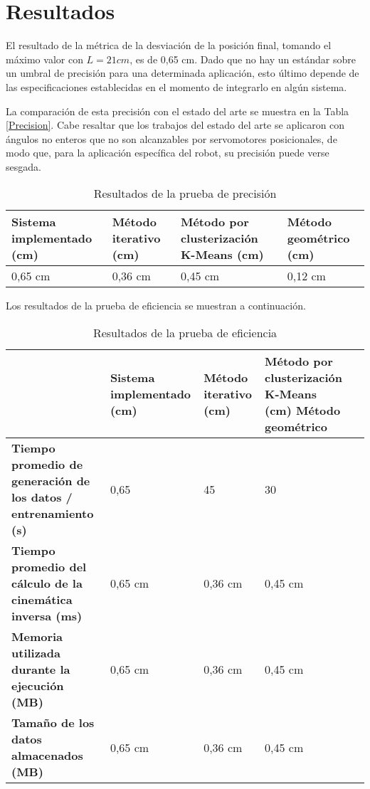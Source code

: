 \section{Resultados}

El resultado de la métrica de la desviación de la posición final, tomando el máximo valor con $L = 21 cm$, es de 0,65 cm. Dado que no hay un estándar sobre un umbral de precisión para una determinada aplicación, esto último depende de las especificaciones establecidas en el momento de integrarlo en algún sistema.

La comparación de esta precisión con el estado del arte se muestra en la Tabla \ref{Precision}. Cabe resaltar que los trabajos del estado del arte se aplicaron con ángulos no enteros que no son alcanzables por servomotores posicionales, de modo que, para la aplicación específica del robot, su precisión puede verse sesgada.

\begin{table}[ht]
	\centering
	\begin{tabular}{p{5cm}p{4cm}p{3.6cm}p{4cm}}
		\hline
		\textbf{Sistema implementado (cm)} & \textbf{Método iterativo (cm)} & \textbf{Método por clusterización K-Means (cm)} & \textbf{Método geométrico (cm)} \\
		\hline
		0,65 cm & 0,36 cm & 0,45 cm & 0,12 cm \\
		\hline
	\end{tabular}
	\caption{Resultados de la prueba de precisión}
	\label{tab:Precision}
\end{table}

Los resultados de la prueba de eficiencia se muestran a continuación.

\begin{table}[ht]
	\centering
	\begin{tabular}{p{4cm}p{5cm}p{4cm}p{3.6cm}p{4cm}}
		\hline
	    \texbf{} & \textbf{Sistema implementado (cm)} & \textbf{Método iterativo (cm)} & \textbf{Método por clusterización K-Means (cm)} \textbf{Método geométrico} \\
		\hline
		\textbf{Tiempo promedio de generación de los datos / entrenamiento (s)} & 0,65 & 45 & 30 \\
		\textbf{Tiempo promedio del cálculo de la cinemática inversa (ms)} & 0,65 cm & 0,36 cm & 0,45 cm \\
		\textbf{Memoria utilizada durante la ejecución (MB)} & 0,65 cm & 0,36 cm & 0,45 cm \\
		\textbf{Tamaño de los datos almacenados (MB)} & 0,65 cm & 0,36 cm & 0,45 cm \\
		\hline
	\end{tabular}
	\caption{Resultados de la prueba de eficiencia}
	\label{tab:Precision}
\end{table}
